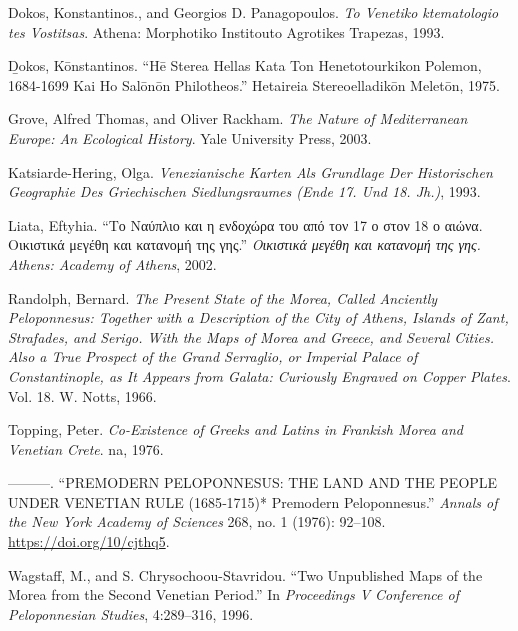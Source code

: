 \documentclass[english,]{book}
\begin{document}
\leavevmode\hypertarget{ref-dokosVenetikoKtematologioTes1993}{}%
Dokos, Konstantinos., and Georgios D. Panagopoulos. \emph{To Venetiko ktematologio tes Vostitsas}. Athena: Morphotiko Institouto Agrotikes Trapezas, 1993.

\leavevmode\hypertarget{ref-dokosHeStereaHellas1975}{}%
D̲okos, Kōnstantinos. ``Hē Sterea Hellas Kata Ton Henetotourkikon Polemon, 1684-1699 Kai Ho Salōnōn Philotheos.'' Hetaireia Stereoelladikōn Meletōn, 1975.

\leavevmode\hypertarget{ref-groveNatureMediterraneanEurope2003}{}%
Grove, Alfred Thomas, and Oliver Rackham. \emph{The Nature of Mediterranean Europe: An Ecological History}. Yale University Press, 2003.

\leavevmode\hypertarget{ref-katsiarde-heringVenezianischeKartenAls1993}{}%
Katsiarde-Hering, Olga. \emph{Venezianische Karten Als Grundlage Der Historischen Geographie Des Griechischen Siedlungsraumes (Ende 17. Und 18. Jh.)}, 1993.

\leavevmode\hypertarget{ref-liataNayplioKaiEndohora2002}{}%
Liata, Eftyhia. ``Το Ναύπλιο και η ενδοχώρα του από τον 17 ο στον 18 ο αιώνα. Οικιστικά μεγέθη και κατανομή της γης.'' \emph{Οικιστικά μεγέθη και κατανομή της γης. Athens: Academy of Athens}, 2002.

\leavevmode\hypertarget{ref-randolphPresentStateMorea1966}{}%
Randolph, Bernard. \emph{The Present State of the Morea, Called Anciently Peloponnesus: Together with a Description of the City of Athens, Islands of Zant, Strafades, and Serigo. With the Maps of Morea and Greece, and Several Cities. Also a True Prospect of the Grand Serraglio, or Imperial Palace of Constantinople, as It Appears from Galata: Curiously Engraved on Copper Plates}. Vol. 18. W. Notts, 1966.

\leavevmode\hypertarget{ref-toppingCoexistenceGreeksLatins1976}{}%
Topping, Peter. \emph{Co-Existence of Greeks and Latins in Frankish Morea and Venetian Crete}. na, 1976.

\leavevmode\hypertarget{ref-toppingPREMODERNPELOPONNESUSLAND1976}{}%
---------. ``PREMODERN PELOPONNESUS: THE LAND AND THE PEOPLE UNDER VENETIAN RULE (1685‐1715)* Premodern Peloponnesus.'' \emph{Annals of the New York Academy of Sciences} 268, no. 1 (1976): 92--108. \url{https://doi.org/10/cjthq5}.

\leavevmode\hypertarget{ref-wagstaffTwoUnpublishedMaps1996}{}%
Wagstaff, M., and S. Chrysochoou-Stavridou. ``Two Unpublished Maps of the Morea from the Second Venetian Period.'' In \emph{Proceedings V Conference of Peloponnesian Studies}, 4:289--316, 1996.
\end{document}
